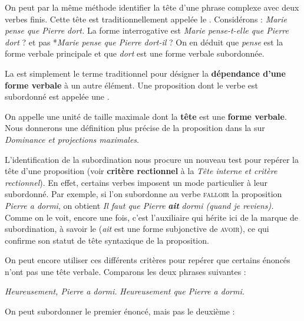 On peut par la même méthode identifier la tête d’une phrase complexe avec deux verbes finis. Cette tête est traditionnellement appelée le . Considérons :
\ea
\textit{{Marie pense que Pierre dort}.}
\z
La forme interrogative est \textit{Marie pense-t-elle que Pierre dort} ? et pas *\textit{Marie pense que Pierre dort-il} ? On en déduit que \textit{pense} est la forme verbale principale et que \textit{dort} est une forme verbale subordonnée.

{La  est simplement le terme traditionnel pour désigner la \textbf{dépendance d’une} \textbf{forme verbale} à un autre élément.  Une proposition dont le verbe est subordonné est appelée une .}

On appelle  une unité de taille maximale dont la \textbf{tête} est une \textbf{forme verbale}. Nous donnerons une définition plus précise de la proposition dans la  sur \textit{Dominance et projections maximales}.

L’identification de la subordination nous procure un nouveau test pour repérer la tête d’une proposition (voir \textbf{critère rectionnel} à la  \textit{Tête interne et critère rectionnel}). En effet, certains verbes imposent un mode particulier à leur subordonné. Par exemple, si l’on subordonne au verbe \textsc{falloir} la proposition \textit{Pierre a dormi}, on obtient \textit{Il faut que Pierre} \textbf{\textit{ait}} \textit{dormi (quand je reviens).} Comme on le voit, encore une fois, c’est l’auxiliaire qui hérite ici de la marque de subordination, à savoir le  (\textit{ait} est une forme subjonctive de \textsc{avoir}), ce qui confirme son statut de tête syntaxique de la proposition.

On peut encore utiliser ces différents critères pour repérer que certains énoncés n’ont pas une tête verbale. Comparons les deux phrases suivantes :

\ea 
  \ea \textit{Heureusement, Pierre a dormi.}
  \ex \textit{Heureusement que Pierre a dormi.}
  \z
\z

On peut subordonner le premier énoncé, mais pas le deuxième :

\ea
  \z
\z

